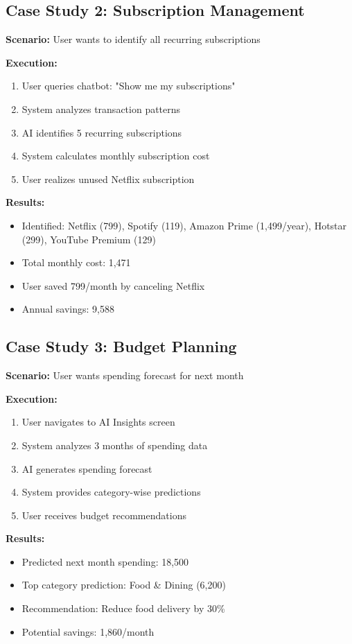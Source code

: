 \documentclass[11pt,a4paper]{report}
\begin{document}
\begin{itemize}
\begin{itemize}
\subsection{Case Study 2: Subscription Management}

\textbf{Scenario:} User wants to identify all recurring subscriptions

\textbf{Execution:}
\begin{enumerate}
    \item User queries chatbot: "Show me my subscriptions"
    \item System analyzes transaction patterns
    \item AI identifies 5 recurring subscriptions
    \item System calculates monthly subscription cost
    \item User realizes unused Netflix subscription
\end{enumerate}

\textbf{Results:}
\begin{itemize}
    \item Identified: Netflix (799), Spotify (119), Amazon Prime (1,499/year), Hotstar (299), YouTube Premium (129)
    \item Total monthly cost: 1,471
    \item User saved 799/month by canceling Netflix
    \item Annual savings: 9,588
\end{itemize}

\subsection{Case Study 3: Budget Planning}

\textbf{Scenario:} User wants spending forecast for next month

\textbf{Execution:}
\begin{enumerate}
    \item User navigates to AI Insights screen
    \item System analyzes 3 months of spending data
    \item AI generates spending forecast
    \item System provides category-wise predictions
    \item User receives budget recommendations
\end{enumerate}

\textbf{Results:}
\begin{itemize}
    \item Predicted next month spending: 18,500
    \item Top category prediction: Food \& Dining (6,200)
    \item Recommendation: Reduce food delivery by 30\%
    \item Potential savings: 1,860/month
\end{itemize}


\end{itemize}
\end{itemize}
\end{document}

